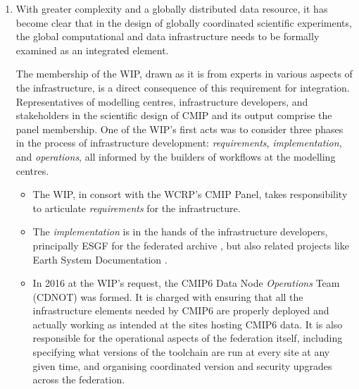 \documentclass[gmd,manuscript]{copernicus}
\begin{document}
\begin{enumerate}
\item With greater complexity and a globally distributed data
  resource, it has become clear that in the design of globally
  coordinated scientific experiments, the global computational and
  data infrastructure needs to be formally examined as an integrated
  element.
  
  The membership of the WIP, drawn as it is from experts in various
  aspects of the infrastructure, is a direct consequence of this
  requirement for integration. Representatives of modelling centres,
  infrastructure developers, and stakeholders in the scientific design
  of CMIP and its output comprise the panel membership. One of the
  WIP's first acts was to consider three phases in the process of
  infrastructure development: \emph{requirements},
  \emph{implementation}, and \emph{operations}, all informed by the
  builders of workflows at the modelling centres.
    
  \begin{itemize}
  \item The WIP, in consort with the WCRP's CMIP Panel, takes
    responsibility to articulate \emph{requirements} for the
    infrastructure.
  \item The \emph{implementation} is in the hands of the
    infrastructure developers, principally ESGF for the federated
    archive \citep{ref:williamsetal2015}, but also related projects
    like Earth System Documentation
    \citep[\href{https://www.earthsystemcog.org/projects/es-doc-models/
    }{ES-DOC}\footnote{https://www.earthsystemcog.org/projects/es-doc-models/
      , retrieved \today.} ,][]{ref:guilyardietal2013}.
  \item In 2016 at the WIP's request, the CMIP6 Data Node
    \emph{Operations} Team (CDNOT) was formed. It is charged with
    ensuring that all the infrastructure elements needed by CMIP6 are
    properly deployed and actually working as intended at the sites
    hosting CMIP6 data. It is also responsible for the operational
    aspects of the federation itself, including specifying what
    versions of the toolchain are run at every site at any given time,
    and organising coordinated version and security upgrades across
    the federation.
  \end{itemize}


\end{enumerate}
\end{document}
